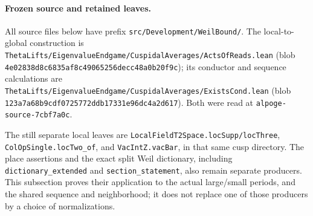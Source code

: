 \paragraph{Frozen source and retained leaves.}
All source files below have prefix
\texttt{src/Development/WeilBound/}.
The local-to-global construction is
\texttt{ThetaLifts/EigenvalueEndgame/CuspidalAverages/ActsOfReads.lean}
(blob \texttt{4e02838d8c6835af8c49065256decc48a0b20f9c});
its conductor and sequence calculations are
\texttt{ThetaLifts/EigenvalueEndgame/CuspidalAverages/ExistsCond.lean}
(blob \texttt{123a7a68b9cdf0725772ddb17331e96dc4a2d617}).
Both were read at \texttt{alpoge-source-7cbf7a0c}.

The still separate local leaves are
\texttt{LocalFieldT2Space.locSupp/locThree},
\texttt{ColOpSingle.locTwo\_of}, and
\texttt{VacIntZ.vacBar}, in that same cusp directory.
The place assertions and the exact split Weil dictionary, including
\texttt{dictionary\_extended} and \texttt{section\_statement},
also remain separate producers.
This subsection proves their application to the actual large/small
periods, and the shared sequence and neighborhood; it does not replace
one of those producers by a choice of normalizations.
